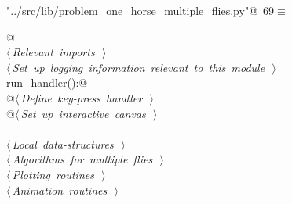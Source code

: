 \documentclass[11.5pt]{report}
\begin{document}
\begin{flushleft} \small\label{scrap100}\raggedright\small
{} \verb@"../src/lib/problem_one_horse_multiple_flies.py"@\nobreak\ {\footnotesize {69}}$\equiv$
\vspace{-1ex}
\begin{list}{}{} \item
\mbox{}\verb@    @\\
\mbox{}\verb@@\hbox{$\langle\,${\itshape Relevant imports}\nobreak\ {\footnotesize {}}$\,\rangle$}\verb@@\\
\mbox{}\verb@@\hbox{$\langle\,${\itshape Set up logging information relevant to this module}\nobreak\ {\footnotesize {}}$\,\rangle$}\verb@@\\
\mbox{}\verb@def run_handler():@\\
\mbox{}\verb@    @\hbox{$\langle\,${\itshape Define key-press handler}\nobreak\ {\footnotesize {}}$\,\rangle$}\verb@@\\
\mbox{}\verb@    @\hbox{$\langle\,${\itshape Set up interactive canvas}\nobreak\ {\footnotesize {}}$\,\rangle$}\verb@@\\
\mbox{}\verb@@\\
\mbox{}\verb@@\hbox{$\langle\,${\itshape Local data-structures}\nobreak\ {\footnotesize {}}$\,\rangle$}\verb@@\\
\mbox{}\verb@@\hbox{$\langle\,${\itshape Algorithms for multiple flies}\nobreak\ {\footnotesize {}}$\,\rangle$}\verb@@\\
\mbox{}\verb@@\hbox{$\langle\,${\itshape Plotting routines}\nobreak\ {\footnotesize {}}$\,\rangle$}\verb@@\\
\mbox{}\verb@@\hbox{$\langle\,${\itshape Animation routines}\nobreak\ {\footnotesize {}}$\,\rangle$}\verb@@\\
\mbox{}\verb@@{\NWsep}
\end{list}
\vspace{-1.5ex}
\footnotesize
\begin{list}{}{\setlength{\itemsep}{-\parsep}\setlength{\itemindent}{-\leftmargin}}

\item{}
\end{list}
\vspace{4ex}
\end{flushleft}


\newpage
\end{document}
